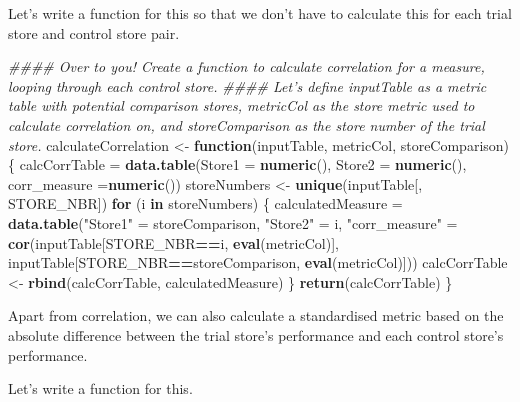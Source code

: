 \documentclass[]{article}
\newenvironment{Shaded}{\begin{snugshade}}{\end{snugshade}}
\newcommand{\CommentTok}[1]{\textcolor[rgb]{0.56,0.35,0.01}{\textit{#1}}}
\newcommand{\ControlFlowTok}[1]{\textcolor[rgb]{0.13,0.29,0.53}{\textbf{#1}}}
\newcommand{\DataTypeTok}[1]{\textcolor[rgb]{0.13,0.29,0.53}{#1}}
\newcommand{\KeywordTok}[1]{\textcolor[rgb]{0.13,0.29,0.53}{\textbf{#1}}}
\newcommand{\NormalTok}[1]{#1}
\newcommand{\OperatorTok}[1]{\textcolor[rgb]{0.81,0.36,0.00}{\textbf{#1}}}
\newcommand{\StringTok}[1]{\textcolor[rgb]{0.31,0.60,0.02}{#1}}
\begin{document}
Let's write a function for this so that we don't have to calculate this
for each trial store and control store pair.

\begin{Shaded}
\begin{Highlighting}[]
\CommentTok{#### Over to you! Create a function to calculate correlation for a measure, looping through each control store.}
\CommentTok{#### Let's define inputTable as a metric table with potential comparison stores, metricCol as the store metric used to calculate correlation on, and storeComparison as the store number of the trial store.}
\NormalTok{calculateCorrelation <-}\StringTok{ }\ControlFlowTok{function}\NormalTok{(inputTable, metricCol, storeComparison) \{}
\NormalTok{  calcCorrTable =}\StringTok{ }\KeywordTok{data.table}\NormalTok{(}\DataTypeTok{Store1 =} \KeywordTok{numeric}\NormalTok{(), }
                             \DataTypeTok{Store2 =} \KeywordTok{numeric}\NormalTok{(), }
                             \DataTypeTok{corr_measure =}\KeywordTok{numeric}\NormalTok{())}
\NormalTok{  storeNumbers <-}\StringTok{ }\KeywordTok{unique}\NormalTok{(inputTable[, STORE_NBR])}
  \ControlFlowTok{for}\NormalTok{ (i }\ControlFlowTok{in}\NormalTok{ storeNumbers) \{}
\NormalTok{    calculatedMeasure =}\StringTok{ }\KeywordTok{data.table}\NormalTok{(}\StringTok{"Store1"}\NormalTok{ =}\StringTok{ }\NormalTok{storeComparison,}
                                   \StringTok{"Store2"}\NormalTok{ =}\StringTok{ }\NormalTok{i,}
                                   \StringTok{"corr_measure"}\NormalTok{ =}\StringTok{ }\KeywordTok{cor}\NormalTok{(inputTable[STORE_NBR}\OperatorTok{==}\NormalTok{i, }\KeywordTok{eval}\NormalTok{(metricCol)],}
\NormalTok{                                                        inputTable[STORE_NBR}\OperatorTok{==}\NormalTok{storeComparison, }\KeywordTok{eval}\NormalTok{(metricCol)]))}
\NormalTok{    calcCorrTable <-}\StringTok{ }\KeywordTok{rbind}\NormalTok{(calcCorrTable, calculatedMeasure)}
\NormalTok{  \}}
  \KeywordTok{return}\NormalTok{(calcCorrTable)}
\NormalTok{\}}
\end{Highlighting}
\end{Shaded}

Apart from correlation, we can also calculate a standardised metric
based on the absolute difference between the trial store's performance
and each control store's performance.

Let's write a function for this.
\end{document}
